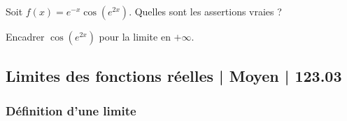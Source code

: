 \begin{question}

Soit $f(x)= e^{-x}\cos(e^{2x})$. Quelles sont les assertions vraies ?
\begin{answers}
    
        
    
\end{answers}
\begin{explanations}
 Encadrer $\cos(e^{2x})$ pour la limite en $+\infty$.
\end{explanations}

\end{question}


\subsection{Limites des fonctions réelles | Moyen | 123.03}

\subsubsection{Définition d'une limite}

